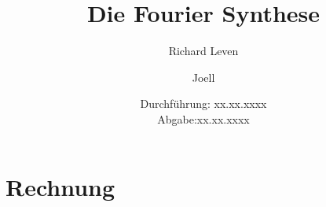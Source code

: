 \documentclass{scrartcl}
\title{Die Fourier Synthese}
\author{Richard Leven \and Joell}
\date{
    Durchführung: xx.xx.xxxx\\
    Abgabe:xx.xx.xxxx
}
\begin{document}
\maketitle
\section{Rechnung}

\end{document}
